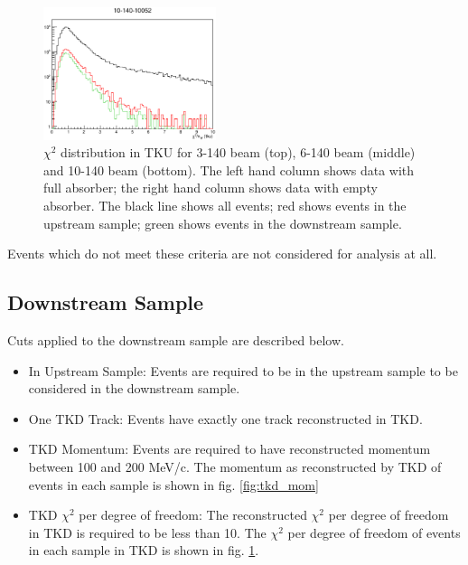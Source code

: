 \begin{figure}[!tbh]
    \includegraphics*[width=0.45\textwidth]{analysis_plots/plots_10-140-empty/chi2_tku.eps}
    \caption{$\chi^2$ distribution in TKU for 3-140 beam (top), 6-140 beam (middle) and 10-140 beam (bottom).
    The left hand column shows data with full absorber; the right hand column shows data with empty absorber.
    The black line shows all events; red shows events in the upstream sample; green shows events in the downstream sample.
    \label{fig:tku_chi2}}
\end{figure}

Events which do not meet these criteria are not considered for analysis at all.

\subsection{Downstream Sample}
Cuts applied to the downstream sample are described below.

\begin{itemize}
\item{In Upstream Sample:} Events are required to be in the upstream sample to
be considered in the downstream sample.
\item{One TKD Track:} Events have exactly one track reconstructed in TKD.
\item{TKD Momentum:} Events are required to have reconstructed momentum between 
100 and 200  MeV/c. The momentum as reconstructed by TKD of events in each 
sample is shown in fig. \ref{fig:tkd_mom}
\item{TKD $\chi^2$ per degree of freedom:} The reconstructed $\chi^2$ per degree of freedom in TKD is 
required to be less than 10. The $\chi^2$ per degree of freedom of events in 
each sample in TKD is shown in fig. \ref{fig:tku_chi2}.
\end{itemize}

